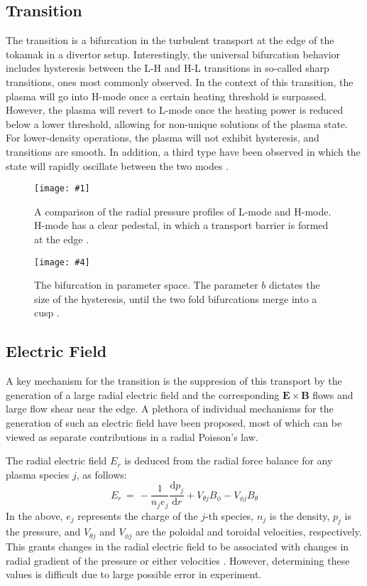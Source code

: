 \documentclass[a4paper]{article}
\newcommand\TwoFig[6]{%
	\sbox\IBoxA{\texttt{[image: \#1]}}
	\sbox\IBoxB{\texttt{[image: \#4]}}%
	\ifdim\ht\IBoxA>\ht\IBoxB
		\setlength\IHeight{\ht\IBoxB}%
	\else\setlength\IHeight{\ht\IBoxA}\fi
	\begin{figure}[!htb]
		\minipage[t]{0.45\textwidth}\centering
			\texttt{[image: \#1]}
			\caption{#2}\label{#3}
		\endminipage\hfill
		\minipage[t]{0.45\textwidth}\centering
			\texttt{[image: \#4]}
			\caption{#5}\label{#6}
		\endminipage
	\end{figure}%
}
\begin{document}
\subsection{Transition}
The transition is a bifurcation in the turbulent transport at the edge of the tokamak in a divertor setup.
Interestingly, the universal bifurcation behavior includes hysteresis between the L-H and H-L transitions in so-called sharp transitions, ones most commonly observed.
In the context of this transition, the plasma will go into H-mode once a certain heating threshold is surpassed.
However, the plasma will revert to L-mode once the heating power is reduced below a lower threshold, allowing for non-unique solutions of the plasma state.
For lower-density operations, the plasma will not exhibit hysteresis, and transitions are smooth.
In addition, a third type have been observed in which the state will rapidly oscillate between the two modes \cite{weymiens_bifurcation_2014}.

\TwoFig{../../Graphics/L-mode_H-mode_compare.png}
	{A comparison of the radial pressure profiles of L-mode and H-mode.
	H-mode has a clear pedestal, in which a transport barrier is formed at the edge \cite{weymiens_bifurcation_2014}.}
	{fig:L-mode_H-mode_compare}
	{../../Graphics/Bif_3D.png}
	{The bifurcation in parameter space. The parameter $b$ dictates the size of the hysteresis, until the two fold bifurcations merge into a cusp \cite{weymiens_bifurcation_2014}.}
	{fig:Bif_3D}

\subsection{Electric Field}
A key mechanism for the transition is the suppresion of this transport by the generation of a large radial electric field and the corresponding $\mathbf{E}\times\mathbf{B}$ flows and large flow shear near the edge.
A plethora of individual mechanisms for the generation of such an electric field have been proposed, most of which can be viewed as separate contributions in a radial Poisson's law.

The radial electric field $E_r$ is deduced from the radial force balance for any plasma species $j$, as follows:
\begin{equation}
	E_r \,=\, -\frac{1}{n_j e_j} \frac{\text{d} p_j}{\text{d} r} + V_{\theta j} B_\phi - V_{\phi j} B_\theta
	\label{eq:E_r}
\end{equation}
In the above, $e_j$ represents the charge of the $j$-th species, $n_j$ is the density, $p_j$ is the pressure, and $V_{\theta j}$ and $V_{\phi j}$ are the poloidal and toroidal velocities, respectively.
This grants changes in the radial electric field to be associated with changes in radial gradient of the pressure or either velocities \cite{connor_review_2000}\cite{staps_backstepping_2017}.
However, determining these values is difficult due to large possible error in experiment.
\end{document}
